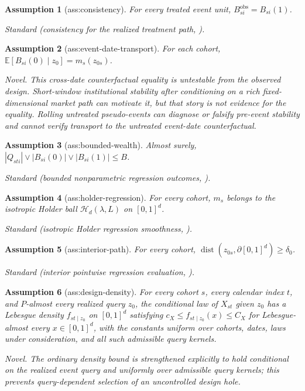 \documentclass{article}
\newtheorem{assumption}{Assumption}
\begin{document}
\begin{assumption}[ass:consistency]\label{ass:consistency}
For every treated event unit, \(B_{si}^{\mathrm{obs}}=B_{si}(1)\).
\par\smallskip\noindent\emph{Standard} (consistency for the realized treatment path, \cite{Abadie2021}).
\end{assumption}

\begin{assumption}[ass:event-date-transport]\label{ass:event-date-transport}
For each cohort, \(\mathbb E[B_{si}(0)\mid z_0]=m_s(z_{0s})\).
\par\smallskip\noindent\emph{Novel.} This cross-date counterfactual equality is untestable from the observed design. Short-window institutional stability after conditioning on a rich fixed-dimensional market path can motivate it, but that story is not evidence for the equality. Rolling untreated pseudo-events can diagnose or falsify pre-event stability and cannot verify transport to the untreated event-date counterfactual.
\end{assumption}

\begin{assumption}[ass:bounded-wealth]\label{ass:bounded-wealth}
Almost surely, \( |Q_{sti}|\vee|B_{si}(0)|\vee|B_{si}(1)|\le B\).
\par\smallskip\noindent\emph{Standard} (bounded nonparametric regression outcomes, \cite{ArmstrongKolesar2020}).
\end{assumption}

\begin{assumption}[ass:holder-regression]\label{ass:holder-regression}
For every cohort, \(m_s\) belongs to the isotropic Holder ball \(\mathcal H_d(\lambda,L)\) on \([0,1]^d\).
\par\smallskip\noindent\emph{Standard} (isotropic Holder regression smoothness, \cite{Stone1982}).
\end{assumption}

\begin{assumption}[ass:interior-path]\label{ass:interior-path}
For every cohort, \(\operatorname{dist}(z_{0s},\partial[0,1]^d)\ge\delta_0\).
\par\smallskip\noindent\emph{Standard} (interior pointwise regression evaluation, \cite{Fan1993}).
\end{assumption}

\begin{assumption}[ass:design-density]\label{ass:design-density}
For every cohort \(s\), every calendar index \(t\), and \(P\)-almost every realized query \(z_0\), the conditional law of \(X_{st}\) given \(z_0\) has a Lebesgue density \(f_{st\mid z_0}\) on \([0,1]^d\) satisfying \(c_X\le f_{st\mid z_0}(x)\le C_X\) for Lebesgue-almost every \(x\in[0,1]^d\), with the constants uniform over cohorts, dates, laws under consideration, and all such admissible query kernels.
\par\smallskip\noindent\emph{Novel.} The ordinary density bound is strengthened explicitly to hold conditional on the realized event query and uniformly over admissible query kernels; this prevents query-dependent selection of an uncontrolled design hole.
\end{assumption}
\end{document}
